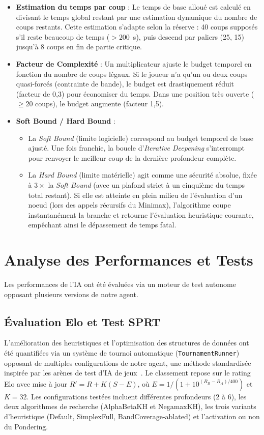 \documentclass[12pt,a4paper]{article}
\begin{document}
\begin{itemize}
    \item \textbf{Estimation du temps par coup} : Le temps de base alloué est calculé en divisant le temps global restant par une estimation dynamique du nombre de coups restants. Cette estimation s'adapte selon la réserve : 40 coups supposés s'il reste beaucoup de temps ($> 200$~s), puis descend par paliers (25, 15) jusqu'à 8 coups en fin de partie critique.
    \item \textbf{Facteur de Complexité} : Un multiplicateur ajuste le budget temporel en fonction du nombre de coups légaux. Si le joueur n'a qu'un ou deux coups quasi-forcés (contrainte de bande), le budget est drastiquement réduit (facteur de 0,3) pour économiser du temps. Dans une position très ouverte ($\ge 20$ coups), le budget augmente (facteur 1,5).
    \item \textbf{Soft Bound / Hard Bound} : 
    \begin{itemize}
        \item La \textit{Soft Bound} (limite logicielle) correspond au budget temporel de base ajusté. Une fois franchie, la boucle d'\textit{Iterative Deepening} s'interrompt pour renvoyer le meilleur coup de la dernière profondeur complète.
        \item La \textit{Hard Bound} (limite matérielle) agit comme une sécurité absolue, fixée à $3 \times$ la \textit{Soft Bound} (avec un plafond strict à un cinquième du temps total restant). Si elle est atteinte en plein milieu de l'évaluation d'un noeud (lors des appels récursifs du Minimax), l'algorithme coupe instantanément la branche et retourne l'évaluation heuristique courante, empêchant ainsi le dépassement de temps fatal.
    \end{itemize}
\end{itemize}





\section{Analyse des Performances et Tests}
Les performances de l'IA ont été évaluées via un moteur de test autonome opposant plusieurs versions de notre agent.


\subsection{Évaluation Elo et Test SPRT}
L'amélioration des heuristiques et l'optimisation des structures de données ont été quantifiées via un système de tournoi automatique (\texttt{TournamentRunner}) opposant de multiples configurations de notre agent, une méthode standardisée inspirée par les arènes de test d'IA de jeux~\cite{chess_tournament_youtube}. Le classement repose sur le rating Elo avec mise à jour $R' = R + K(S - E)$, où $E = 1/(1 + 10^{(R_B - R_A)/400})$ et $K = 32$. Les configurations testées incluent différentes profondeurs (2 à 6), les deux algorithmes de recherche (AlphaBetaKH et NegamaxKH), les trois variants d'heuristique (Default, SimplexFull, BandCoverage-ablated) et l'activation ou non du Pondering.
\end{document}
